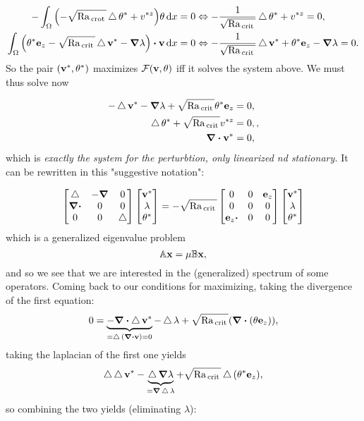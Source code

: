 \documentclass[reqno, a4paper]{article}
\begin{document}
\begin{align*}
	- \int_{\Omega}\qty(-\sqrt{\Rayleigh_{\, \text{crot} \,}}\laplace \theta^{*} + v^{*z}) \theta\dd{x} = 0 &\Leftrightarrow -\frac{1}{\sqrt{\Rayleigh_{\, \text{crit} \,}}}\laplace \theta^{*} + v^{*z} = 0, \\
	\int_{\Omega}\qty(\theta^{*} \vb{e}_z - \sqrt{\Rayleigh_{\, \text{crit} \,}}\laplace \vb{v}^{*} - \grad \lambda)\vdot \vb{v}\dd{x} = 0 &\Leftrightarrow - \frac{1}{\sqrt{\Rayleigh_{\, \text{crit} \,}}}\laplace \vb{v}^{*} + \theta^{*} \vb{e}_z - \grad \lambda =0.
\end{align*}
So the pair $\qty(\vb{v}^{*}, \theta^{*})$ maximizes $\mathcal{F}\qty(\vb{v}, \theta)$ iff it solves the system above. We must thus solve now

\begin{align*}
	- \laplace \vb{v}^{*} - \grad \lambda + \sqrt{\Rayleigh_{\, \text{crit} \,}}\theta^{*} \vb{e}_z &= 0, \\
	\laplace \theta^{*} + \sqrt{\Rayleigh_{\, \text{crit} \,}}v^{*z} &= 0,, \\
	\divergence{\vb{v}^{*}}&= 0,
\end{align*}
which is \textit{exactly the system for the perturbtion, only linearized nd stationary.} It can be rewritten in this "suggestive notation":

\[
	\begin{bmatrix}
		\laplace & - \grad & 0 \\
		\grad \vdot & 0 & 0 \\
		0 & 0 & \laplace
	\end{bmatrix}
	\begin{bmatrix}
		\vb{v}^{*}\\
		\lambda \\
		\theta^{*}
	\end{bmatrix}
	= -\sqrt{\Rayleigh_{\, \text{crit} \,}}\begin{bmatrix}
		0 & 0 & \vb{e}_z \\
		0 & 0 & 0 \\
		\vb{e}_z \vdot & 0 & 0
	\end{bmatrix}
	\begin{bmatrix}
		\vb{v}^{*} \\
		\lambda \\
		\theta^{*}
	\end{bmatrix}
\]
which is a generalized eigenvalue problem
\[
	\mathbb{A} \vb{x} = \mu \mathbb{B} \vb{x},
\]
and so we see that we are interested in the (generalized) spectrum of some operators. Coming back to our conditions for maximizing, taking the divergence of the first equation:
\[
	0 = \underbrace{- \divergence{\laplace \vb{v}^{*}}}_{= \laplace \qty(\divergence{\vb{v}}) = 0}- \laplace \lambda + \sqrt{\Rayleigh_{\, \text{crit} \,}}\qty(\divergence{\qty(\theta \vb{e}_z)}),
\]
taking the laplacian of the first one yields
\[
	\operatorname{\bigtriangleup} \operatorname{\bigtriangleup} \vb{v}^{*} - \underbrace{\operatorname{\bigtriangleup} \grad \lambda}_{=\grad \operatorname{\bigtriangleup} \lambda} + \sqrt{\mathrm{Ra}_{\, \text{crit} \,}}\operatorname{\bigtriangleup}\qty(\theta^{*} \vb{e}_{z}),
\]
so combining the two yields (eliminating $\lambda$):
\end{document}
